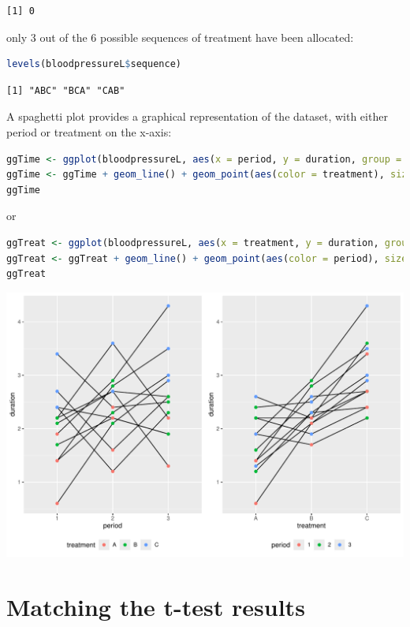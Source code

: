 \documentclass[12pt]{article}
\begin{document}
\label{}
\begin{verbatim}
[1] 0
\end{verbatim}


only 3 out of the 6 possible sequences of treatment have been allocated:
\begin{lstlisting}[language=r,numbers=none]
levels(bloodpressureL$sequence)
\end{lstlisting}

\label{}
\begin{verbatim}
[1] "ABC" "BCA" "CAB"
\end{verbatim}


A spaghetti plot provides a graphical representation of the dataset,
with either period or treatment on the x-axis:
\begin{lstlisting}[language=r,numbers=none]
ggTime <- ggplot(bloodpressureL, aes(x = period, y = duration, group = id))
ggTime <- ggTime + geom_line() + geom_point(aes(color = treatment), size = 2)
ggTime
\end{lstlisting}

or
\begin{lstlisting}[language=r,numbers=none]
ggTreat <- ggplot(bloodpressureL, aes(x = treatment, y = duration, group = id))
ggTreat <- ggTreat + geom_line() + geom_point(aes(color = period), size = 2)
ggTreat
\end{lstlisting}

\begin{center}
\includegraphics[trim={0 0 0 0},width=1\textwidth]{./figures/gg-spaghetti.pdf}
\end{center}

\clearpage
\section{Matching the t-test results}
\label{sec:org15d6bbf}
\end{document}
